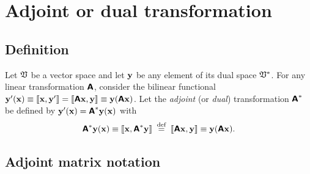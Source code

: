 \section{Adjoint or dual transformation}
\label{2014-m-fdvs-adjoint}

\subsection{Definition}

Let ${\frak V}$ be a vector space and let ${\bf y}$
be any element of its dual space ${\frak V}^\ast$.
For any linear transformation $\textsf{\textbf{A}}$, consider
the bilinear functional
${\bf y}' ({\bf x}) \equiv \llbracket {\bf x} ,{\bf y}'\rrbracket  =\llbracket \textsf{\textbf{A}}{\bf x},{\bf y}\rrbracket  \equiv {\bf y} (\textsf{\textbf{A}} {\bf x})$.
Let the {\em adjoint} (or {\em dual}) transformation $\textsf{\textbf{A}}^\ast$ be defined by
${\bf y}' ({\bf x}) = \textsf{\textbf{A}}^{\ast}{\bf y} ({\bf x})$ with
\begin{equation}
\textsf{\textbf{A}}^\ast {\bf y} ({\bf x})
\equiv
\llbracket {\bf x},\textsf{\textbf{A}}^\ast{\bf y}\rrbracket
\stackrel{{\tiny \textrm{ def }}}{=}
\llbracket \textsf{\textbf{A}}{\bf x},{\bf y}\rrbracket
\equiv
{\bf y} (\textsf{\textbf{A}}{\bf x}).
\label{2016-m-ch-fdlvs-adjointop}
\end{equation}


\subsection{Adjoint matrix notation}

